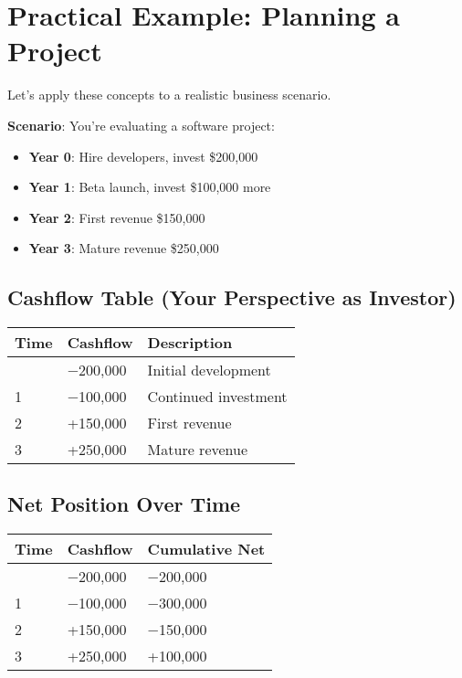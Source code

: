 \documentclass[
  letterpaper,
]{scrbook}
\providecommand{\tightlist}{%
  \setlength{\itemsep}{0pt}\setlength{\parskip}{0pt}}
\begin{document}
\section{Practical Example: Planning a
Project}\label{practical-example-planning-a-project}

Let's apply these concepts to a realistic business scenario.

\textbf{Scenario}: You're evaluating a software project:

\begin{itemize}
\tightlist
\item
  \textbf{Year 0}: Hire developers, invest \$200,000
\item
  \textbf{Year 1}: Beta launch, invest \$100,000 more
\item
  \textbf{Year 2}: First revenue \$150,000
\item
  \textbf{Year 3}: Mature revenue \$250,000
\end{itemize}

\subsection{Cashflow Table (Your Perspective as
Investor)}\label{cashflow-table-your-perspective-as-investor}

\begin{longtable}[]{@{}lll@{}}
\toprule\noalign{}
Time & Cashflow & Description \\
\midrule\noalign{}
\endhead
\bottomrule\noalign{}
\endlastfoot
0 & −200,000 & Initial development \\
1 & −100,000 & Continued investment \\
2 & +150,000 & First revenue \\
3 & +250,000 & Mature revenue \\
\end{longtable}

\subsection{Net Position Over Time}\label{net-position-over-time}

\begin{longtable}[]{@{}lll@{}}
\toprule\noalign{}
Time & Cashflow & Cumulative Net \\
\midrule\noalign{}
\endhead
\bottomrule\noalign{}
\endlastfoot
0 & −200,000 & −200,000 \\
1 & −100,000 & −300,000 \\
2 & +150,000 & −150,000 \\
3 & +250,000 & +100,000 \\
\end{longtable}
\end{document}
